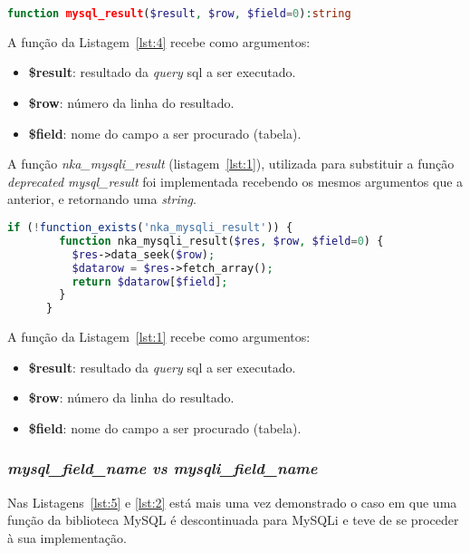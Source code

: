 \begin{lstlisting}[language={php},
                   caption={Função mysql\_result.},
                   label=lst:4]
    	function mysql_result($result, $row, $field=0):string

\end{lstlisting}

A função da Listagem~\ref{lst:4} recebe como argumentos:
\begin{itemize}
  \item \textbf{\$result}: resultado da \textit{query} \acrshort{sql} a ser executado.
  \item \textbf{\$row}: número da linha do resultado.
  \item \textbf{\$field}: nome do campo a ser procurado (tabela).
\end{itemize}


A função \textit{nka\_mysqli\_result} (listagem~\ref{lst:1}), utilizada para substituir a função \textit{deprecated mysql\_result} foi implementada recebendo os mesmos argumentos que a anterior, e retornando uma \textit{string}.

\begin{lstlisting}[language={php},
                   caption={Função para substituir mysql\_result.},
                   label=lst:1]
      if (!function_exists('nka_mysqli_result')) {
      	function nka_mysqli_result($res, $row, $field=0) {
      	  $res->data_seek($row);
      	  $datarow = $res->fetch_array();
      	  return $datarow[$field];
      	}
      }
\end{lstlisting}

A função da Listagem~\ref{lst:1} recebe como argumentos:
\begin{itemize}
  \item \textbf{\$result}: resultado da \textit{query} \acrshort{sql} a ser executado.
  \item \textbf{\$row}: número da linha do resultado.
  \item \textbf{\$field}: nome do campo a ser procurado (tabela).
\end{itemize}


\subsubsection{\textit{mysql\_field\_name vs mysqli\_field\_name}}

Nas Listagens~\ref{lst:5} e \ref{lst:2} está mais uma vez demonstrado o caso em que uma função da biblioteca MySQL é descontinuada para MySQLi e teve de se proceder à sua implementação.

